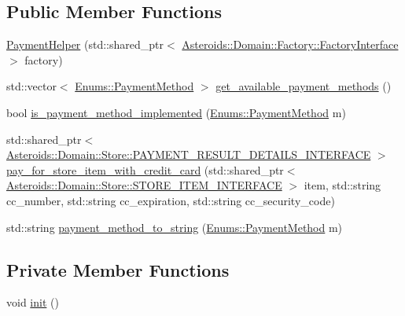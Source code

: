 \subsection*{Public Member Functions}
\begin{DoxyCompactItemize}
\item 
\hyperlink{classAsteroids_1_1Domain_1_1Store_1_1PaymentHelper_a76969f028c9cbad646a492bb38e945b5}{Payment\+Helper} (std\+::shared\+\_\+ptr$<$ \hyperlink{classAsteroids_1_1Domain_1_1Factory_1_1FactoryInterface}{Asteroids\+::\+Domain\+::\+Factory\+::\+Factory\+Interface} $>$ factory)
\item 
std\+::vector$<$ \hyperlink{namespaceAsteroids_1_1Domain_1_1Store_1_1Enums_a0a0c269f6834cb8b1b6ed3bb02983564}{Enums\+::\+Payment\+Method} $>$ \hyperlink{classAsteroids_1_1Domain_1_1Store_1_1PaymentHelper_a97fdef985d90e7ed6170c9f414102ee1}{get\+\_\+available\+\_\+payment\+\_\+methods} ()
\item 
bool \hyperlink{classAsteroids_1_1Domain_1_1Store_1_1PaymentHelper_a5769756eb1f58b351e36f5619745e398}{is\+\_\+payment\+\_\+method\+\_\+implemented} (\hyperlink{namespaceAsteroids_1_1Domain_1_1Store_1_1Enums_a0a0c269f6834cb8b1b6ed3bb02983564}{Enums\+::\+Payment\+Method} m)
\item 
std\+::shared\+\_\+ptr$<$ \hyperlink{classAsteroids_1_1Domain_1_1Store_1_1PAYMENT__RESULT__DETAILS__INTERFACE}{Asteroids\+::\+Domain\+::\+Store\+::\+P\+A\+Y\+M\+E\+N\+T\+\_\+\+R\+E\+S\+U\+L\+T\+\_\+\+D\+E\+T\+A\+I\+L\+S\+\_\+\+I\+N\+T\+E\+R\+F\+A\+CE} $>$ \hyperlink{classAsteroids_1_1Domain_1_1Store_1_1PaymentHelper_a603cc23e44e6e3f760f05c3657bf81c5}{pay\+\_\+for\+\_\+store\+\_\+item\+\_\+with\+\_\+credit\+\_\+card} (std\+::shared\+\_\+ptr$<$ \hyperlink{classAsteroids_1_1Domain_1_1Store_1_1STORE__ITEM__INTERFACE}{Asteroids\+::\+Domain\+::\+Store\+::\+S\+T\+O\+R\+E\+\_\+\+I\+T\+E\+M\+\_\+\+I\+N\+T\+E\+R\+F\+A\+CE} $>$ item, std\+::string cc\+\_\+number, std\+::string cc\+\_\+expiration, std\+::string cc\+\_\+security\+\_\+code)
\item 
std\+::string \hyperlink{classAsteroids_1_1Domain_1_1Store_1_1PaymentHelper_a94fe588a84f831f5717ea5dbf5eb2b2d}{payment\+\_\+method\+\_\+to\+\_\+string} (\hyperlink{namespaceAsteroids_1_1Domain_1_1Store_1_1Enums_a0a0c269f6834cb8b1b6ed3bb02983564}{Enums\+::\+Payment\+Method} m)
\end{DoxyCompactItemize}
\subsection*{Private Member Functions}
\begin{DoxyCompactItemize}
\item 
void \hyperlink{classAsteroids_1_1Domain_1_1Store_1_1PaymentHelper_afc5b560df53ca599a801c77e48f511f2}{init} ()
\end{DoxyCompactItemize}
